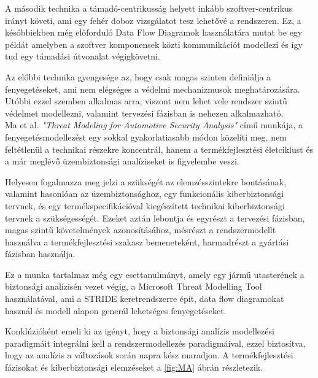 A második technika a támadó-centrikusság helyett inkább szoftver-centrikus irányt követi, ami egy fehér doboz vizsgálatot tesz lehetővé a rendszeren. Ez, a későbbiekben még előforduló Data Flow Diagramok használatára mutat be egy példát amelyben a szoftver komponensek közti kommunikációt modellezi és így tud egy támadási útvonalat végigkövetni. 

Az előbbi technika gyengesége az, hogy csak magas szinten definiálja a fenyegetéseket, ami nem elégséges a védelmi mechanizmusok meghatározására. Utóbbi ezzel szemben alkalmas arra, viszont nem lehet vele rendszer szintű védelmet modellezni, valamint tervezési fázisban is nehezen alkalmazható.\\

Ma et al.\cite{Ma} \textit{"Threat Modeling for Automotive Security Analysis"} című munkája, a fenyegetésmodellezést egy sokkal gyakorlatiasabb módon közelíti meg, nem feltétlenül a technikai részekre koncentrál, hanem a termékfejlesztési életciklust és a már meglévő üzembiztonsági analíziseket is figyelembe veszi.

Helyesen fogalmazza meg jelzi a szükségét az elemzésszintekre bontásának, valamint hasonlóan az üzembiztonsághoz, egy funkcionális kiberbiztonsági tervnek, és egy termékspecifikációval kiegészített technikai kiberbiztonsági tervnek a szükségességét. Ezeket aztán lebontja és egyrészt a tervezési fázisban, magas szintű követelmények azonosításához, mésrészt a rendszermodellt használva a termékfejlesztési szakasz bemeneteként, harmadrészt a gyártási fázisban használja.

Ez a munka tartalmaz még egy esettanulmányt, amely egy jármű utasterének a biztonsági analízisén vezet végig, a Microsoft Threat Modelling Tool használatával, ami a STRIDE keretrendszerre épít, data flow diagramokat használ és modell alapon generál lehetséges fenyegetéseket.

Konklúzióként emeli ki az igényt, hogy a biztonsági analízis modellezési paradigmáit integrálni kell a rendszermodellezés paradigmáival, ezzel biztosítva, hogy az analízis a változások során napra kész maradjon. A termékfejlesztési fázisokat és kiberbiztonsági elemzéseket a \ref{fig:MA} ábrán részletezik.\\

